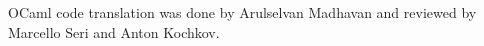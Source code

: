 OCaml code translation was done by Arulselvan Madhavan and reviewed by Marcello Seri and Anton Kochkov.